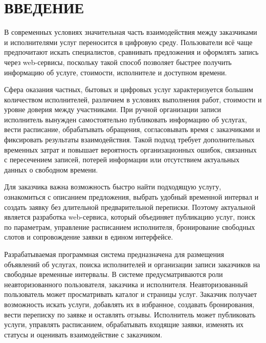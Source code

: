 \section*{ВВЕДЕНИЕ}

В современных условиях значительная часть взаимодействия между заказчиками и исполнителями услуг переносится в цифровую среду. Пользователи всё чаще предпочитают искать специалистов, сравнивать предложения и оформлять запись через web-сервисы, поскольку такой способ позволяет быстрее получить информацию об услуге, стоимости, исполнителе и доступном времени.

Сфера оказания частных, бытовых и цифровых услуг характеризуется большим количеством исполнителей, различием в условиях выполнения работ, стоимости и уровне доверия между участниками. При ручной организации записи исполнитель вынужден самостоятельно публиковать информацию об услугах, вести расписание, обрабатывать обращения, согласовывать время с заказчиками и фиксировать результаты взаимодействия. Такой подход требует дополнительных временных затрат и повышает вероятность организационных ошибок, связанных с пересечением записей, потерей информации или отсутствием актуальных данных о свободном времени.

Для заказчика важна возможность быстро найти подходящую услугу, ознакомиться с описанием предложения, выбрать удобный временной интервал и создать заявку без длительной предварительной переписки. Поэтому актуальной является разработка web-сервиса, который объединяет публикацию услуг, поиск по параметрам, управление расписанием исполнителя, бронирование свободных слотов и сопровождение заявки в едином интерфейсе.

Разрабатываемая программная система предназначена для размещения объявлений об услугах, поиска исполнителей и организации записи заказчиков на свободные временные интервалы. В системе предусматриваются роли неавторизованного пользователя, заказчика и исполнителя. Неавторизованный пользователь может просматривать каталог и страницы услуг. Заказчик получает возможность искать услуги, добавлять их в избранное, создавать бронирования, вести переписку по заявке и оставлять отзывы. Исполнитель может публиковать услуги, управлять расписанием, обрабатывать входящие заявки, изменять их статусы и оценивать взаимодействие с заказчиком.

